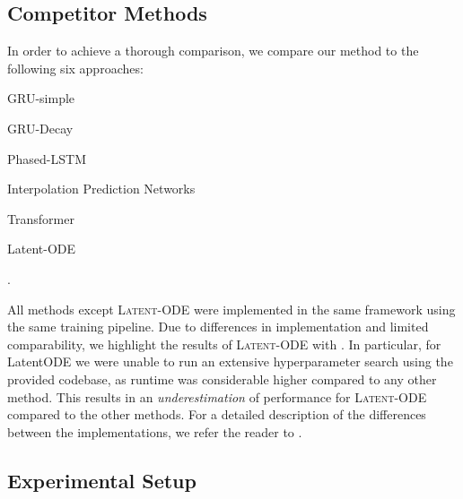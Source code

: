 \documentclass{article}
\newcommand{\method}[1]{\textsc{#1}}
\begin{document}
\subsection{Competitor Methods}


In order to achieve a thorough comparison, we compare our method to the
following six approaches: \begin{inparaenum}
    \item GRU-simple~\citep{che2018recurrent}
    \item GRU-Decay ~\citep{che2018recurrent}
    \item Phased-LSTM~\citep{neil2016phased}
    \item Interpolation Prediction Networks~\citep{shukla2018interpolationprediction}
    \item Transformer~\citep{vaswani2017attention}
    \item Latent-ODE~\citep{rubanova2019latent}
\end{inparaenum}.

All methods except \method{Latent-ODE} were implemented in the same framework
using the same training pipeline.
Due to differences in implementation and limited comparability, we highlight
the results of \method{Latent-ODE} with .  In particular, for
LatentODE we were unable to run an extensive hyperparameter search using the
provided codebase, as runtime was considerable higher compared to any
other method.  This results in an \emph{underestimation} of performance for
\method{Latent-ODE} compared to the other methods. For a detailed description
of the differences between the implementations, we refer the reader to
.

\subsection{Experimental Setup}
\end{document}
